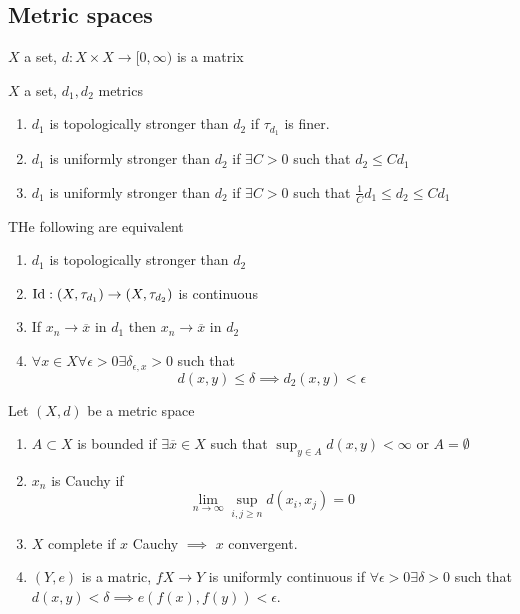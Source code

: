 \documentclass[../main.tex]{subfiles}
\begin{document}
\subsection{Metric spaces}
\begin{defn}
	$X$ a set, $d:X\times X \to [ 0, \infty ) $ is a matrix
\end{defn}
\begin{defn}
	$X$ a set, $d_1,d_2$ metrics
	\begin{enumerate}
	\item $d_1$ is topologically stronger than $d_2$ if $\tau_{d_1} $ is finer.
	\item $d_1$ is uniformly stronger than $d_2$ if $\exists C>0$ such that $d_2 \leq C d_1$ 
	\item $d_1$ is uniformly stronger than $d_2$ if $\exists C>0$ such that $\frac{1}{C} d_1 \leq d_2 \leq C d_1$ 
	\end{enumerate}
\end{defn}
\begin{lemma}
THe following are equivalent
\begin{enumerate}
\item $d_1$ is topologically stronger than $d_2$ 
\item $\operatorname{Id}: ( X,\tau_{d_1} ) \to ( X,\tau_{d_2} ) $ is continuous
\item If $x_n \to \overline{x}$ in $d_1$ then $x_n \to \overline{x}$ in $d_2$ 
\item $\forall x \in X \forall \epsilon>0\exists \delta_{\epsilon,x} >0$ such that
	\[ 
	d( x,y) \leq \delta \implies d_2( x,y) < \epsilon
	\]
\end{enumerate}
\end{lemma}
\begin{defn}
	Let $( X,d) $ be a metric space
	\begin{enumerate}
	\item $A \subset X$ is bounded if $\exists \overline{x}\in X$ such that $\sup_{y \in A} d( x,y) < \infty $ or $A= \emptyset$ 
\item $x_n$ is Cauchy if 
	\[ 
	\lim_{n\to \infty } \sup_{i,j \geq n} d( x_i,x_j ) = 0
	\]

\item $X$ complete if $x$ Cauchy $\implies$ $x$ convergent.
\item $( Y,e) $ is a matric, $fX\to Y$ is uniformly continuous if $\forall \epsilon>0 \exists \delta>0$ such that $d( x,y) < \delta\implies e( f( x) ,f( y) ) < \epsilon$.
	
	\end{enumerate}
	
\end{defn}
\end{document}
